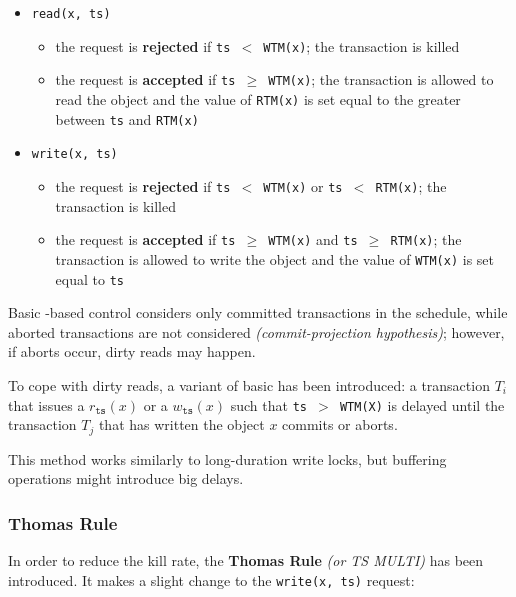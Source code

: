 \documentclass[english]{article}
\begin{document}
\begin{itemize}
  \item \texttt{read(x, ts)}
        \begin{itemize}
          \item[\xmarkthin] the request is \textbf{rejected} if \texttt{ts \(<\) WTM(x)}; the transaction is killed
          \item[\cmarkthin] the request is \textbf{accepted} if \texttt{ts \(\geq\) WTM(x)}; the transaction is allowed to read the object and the value of \texttt{RTM(x)} is set equal to the greater between \texttt{ts} and \texttt{RTM(x)}
        \end{itemize}
  \item \texttt{write(x, ts)}
        \begin{itemize}
          \item[\xmarkthin] the request is \textbf{rejected} if \texttt{ts \(<\) WTM(x)} or \texttt{ts \(<\) RTM(x)}; the transaction is killed
          \item[\cmarkthin] the request is \textbf{accepted} if \texttt{ts \(\geq\) WTM(x)} and \texttt{ts \(\geq\) RTM(x)}; the transaction is allowed to write the object and the value of \texttt{WTM(x)} is set equal to \texttt{ts}
        \end{itemize}
\end{itemize}

\bigskip
Basic \ts-based control considers only committed transactions in the schedule, while aborted transactions are not considered \textit{(commit-projection hypothesis)};
however, if aborts occur, dirty reads may happen.

To cope with dirty reads, a variant of basic \ts has been introduced: a transaction \(T_i\) that issues a \(r_{\texttt{ts}}(x)\) or a \(w_{\texttt{ts}}(x)\) such that \texttt{ts \(>\) WTM(X)} is delayed until the transaction \(T_j\) that has written the object \(x\) commits or aborts.

This method works similarly to long-duration write locks, but buffering operations might introduce big delays.

\subsubsection{Thomas Rule}

In order to reduce the kill rate, the \textbf{Thomas Rule} \textit{(or TS MULTI)} has been introduced.
It makes a slight change to the \texttt{write(x, ts)} request:
\end{document}
